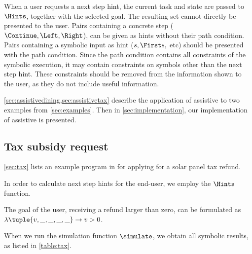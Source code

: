 
When a user requests a next step hint, the current task and state are passed to $\Hints$, together with the selected goal.
The resulting set cannot directly be presented to the user.
Pairs containing a concrete step ($\Continue,\Left,\Right$), can be given as hints without their path condition.
Pairs containing a symbolic input as hint ($s,\First s,$ etc) should be presented with the path condition.
Since the path condition contains all constraints of the symbolic execution, it may contain constraints on symbols other than the next step hint.
These constraints should be removed from the information shown to the user, as they do not include useful information.



\cref{sec:assistivedining,sec:assistivetax} describe the application of assistive \TOPHAT to two examples from \cref{sec:examples}.
Then in \cref{sec:implementation}, our implementation of assistive \TOPHAT is presented.


\subsection{Tax subsidy request}
\label{sec:assistivetax}

\cref{sec:tax} lists an example program in \TOPHAT for applying for a solar panel tax refund.

In order to calculate next step hints for the end-user, we employ the $\Hints$ function.

The goal of the user, receiving a refund larger than zero, can be formulated as $\lambda \tuple{v,\_,\_,\_,\_}\rightarrow v>0$.

When we run the simulation function $\simulate$, we obtain all symbolic results, as listed in \cref{table:tax}.

